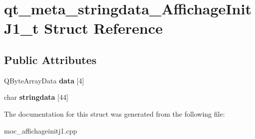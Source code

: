 \hypertarget{structqt__meta__stringdata__AffichageInitJ1__t}{\section{qt\+\_\+meta\+\_\+stringdata\+\_\+\+Affichage\+Init\+J1\+\_\+t Struct Reference}
\label{structqt__meta__stringdata__AffichageInitJ1__t}
}
\subsection*{Public Attributes}
\begin{DoxyCompactItemize}
\item 
\hypertarget{structqt__meta__stringdata__AffichageInitJ1__t_a6e4f85ed6b8fd34fcafe5c9a3e649986}{Q\+Byte\+Array\+Data {\bfseries data} \mbox{[}4\mbox{]}}\label{structqt__meta__stringdata__AffichageInitJ1__t_a6e4f85ed6b8fd34fcafe5c9a3e649986}

\item 
\hypertarget{structqt__meta__stringdata__AffichageInitJ1__t_a3ba448ce151e74e7c98f58315a2724c2}{char {\bfseries stringdata} \mbox{[}44\mbox{]}}\label{structqt__meta__stringdata__AffichageInitJ1__t_a3ba448ce151e74e7c98f58315a2724c2}

\end{DoxyCompactItemize}


The documentation for this struct was generated from the following file\+:\begin{DoxyCompactItemize}
\item 
moc\+\_\+affichageinitj1.\+cpp\end{DoxyCompactItemize}
